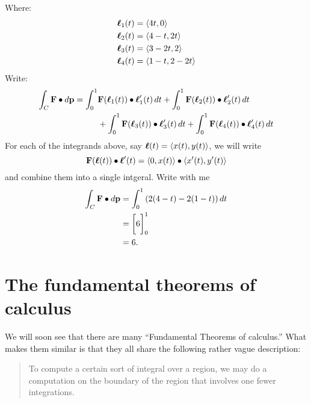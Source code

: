 \documentclass{ximera}
\begin{document}
\begin{example}
\begin{explanation}
\begin{image}
    \end{image}
    Where:
    \begin{align*}
      \boldsymbol{\ell}_1(t) &= \left\langle 4t,0\right\rangle\\
      \boldsymbol{\ell}_2(t) &= \left\langle 4-t,2t\right\rangle\\
      \boldsymbol{\ell}_3(t) &= \left\langle 3-2t,2\right\rangle\\
      \boldsymbol{\ell}_4(t) &= \left\langle 1-t,2-2t\right\rangle
    \end{align*}
    Write:
    \begin{align*}
    \int_C \mathbf{F}\bullet\mathop{}\!d\mathbf{p} = \int_0^1 &\mathbf{F}(\boldsymbol{\ell}_1(t))\bullet \boldsymbol{\ell}_1'(t) \mathop{}\!d t
    + \int_0^1 \mathbf{F}(\boldsymbol{\ell}_2(t))\bullet \boldsymbol{\ell}_2'(t) \mathop{}\!d t\\
    &+ \int_0^1 \mathbf{F}(\boldsymbol{\ell}_3(t))\bullet \boldsymbol{\ell}_3'(t) \mathop{}\!d t
    + \int_0^1 \mathbf{F}(\boldsymbol{\ell}_4(t))\bullet \boldsymbol{\ell}_4'(t) \mathop{}\!d t
    \end{align*}
    For each of the integrands above, say $\boldsymbol{\ell}(t) =
    \left\langle x(t),y(t)\right\rangle$, we will write
    \[
    \mathbf{F}(\boldsymbol{\ell}(t))\bullet \boldsymbol{\ell}'(t) = \left\langle 0,x(t)\right\rangle \bullet \left\langle x'(t),y'(t)\right\rangle
    \]
    and combine them into a single intgeral. Write with me
    \begin{align*}
      \int_C \mathbf{F}\bullet\mathop{}\!d\mathbf{p} &= \int_0^1 \left(2(4-t) -2(1-t) \right)\mathop{}\!d t\\
      &= \bigg[ 6 \bigg]_0^1\\
      &= 6. 
    \end{align*}
  \end{explanation}
\end{example}



\section{The fundamental theorems of calculus}


We will soon see that there are many ``Fundamental Theorems of
calculus.'' What makes them similar is that they all share the
following rather vague description:
\begin{quote}
  To compute a certain sort of integral over a region, we may do a
  computation on the boundary of the region that involves one fewer
  integrations.
\end{quote}
\end{document}
